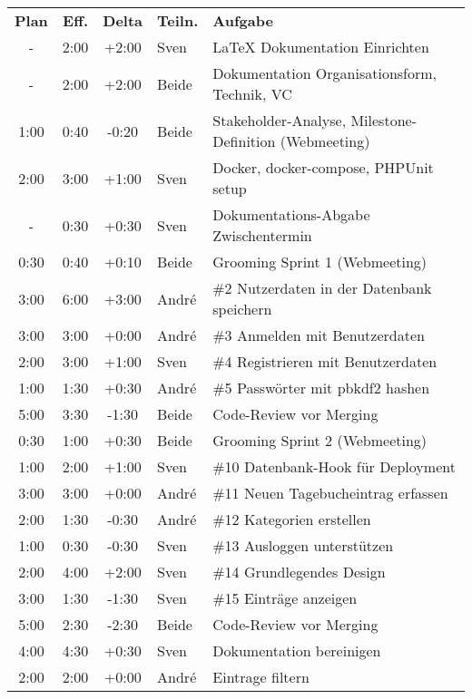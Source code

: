 \begin{longtable}{ c c c l l }
  \textbf{Plan} & \textbf{Eff.} & \textbf{Delta} & \textbf{Teiln.} & \textbf{Aufgabe} \\
  - & 2:00 & +2:00 & Sven & LaTeX Dokumentation Einrichten \\
  - & 2:00 & +2:00 & Beide & Dokumentation Organisationsform, Technik, VC\\
  1:00 & 0:40 & -0:20 & Beide & Stakeholder-Analyse, Milestone-Definition (Webmeeting) \\
  2:00 & 3:00 & +1:00 & Sven & Docker, docker-compose, PHPUnit setup \\
  - & 0:30 & +0:30 & Sven & Dokumentations-Abgabe Zwischentermin \\ 
  0:30 & 0:40 & +0:10 & Beide & Grooming Sprint 1 (Webmeeting) \\
  3:00 & 6:00 & +3:00 & André & \#2 Nutzerdaten in der Datenbank speichern \\
  3:00 & 3:00 & +0:00 & André & \#3 Anmelden mit Benutzerdaten \\
  2:00 & 3:00 & +1:00 & Sven & \#4 Registrieren mit Benutzerdaten \\
  1:00 & 1:30 & +0:30 & André & \#5 Passwörter mit pbkdf2 hashen \\
  5:00 & 3:30 & -1:30 & Beide & Code-Review vor Merging \\
  0:30 & 1:00 & +0:30 & Beide & Grooming Sprint 2 (Webmeeting) \\
  1:00 & 2:00 & +1:00 & Sven & \#10 Datenbank-Hook für Deployment \\
  3:00 & 3:00 & +0:00 & André & \#11 Neuen Tagebucheintrag erfassen \\
  2:00 & 1:30 & -0:30 & André & \#12 Kategorien erstellen \\
  1:00 & 0:30 & -0:30 & Sven & \#13 Ausloggen unterstützen \\
  2:00 & 4:00 & +2:00 & Sven & \#14 Grundlegendes Design \\
  3:00 & 1:30 & -1:30 & Sven & \#15 Einträge anzeigen \\
  5:00 & 2:30 & -2:30 & Beide & Code-Review vor Merging \\
  4:00 & 4:30 & +0:30 & Sven & Dokumentation bereinigen \\
  2:00 & 2:00 & +0:00 & André & Eintrage filtern \\
\end{longtable}
